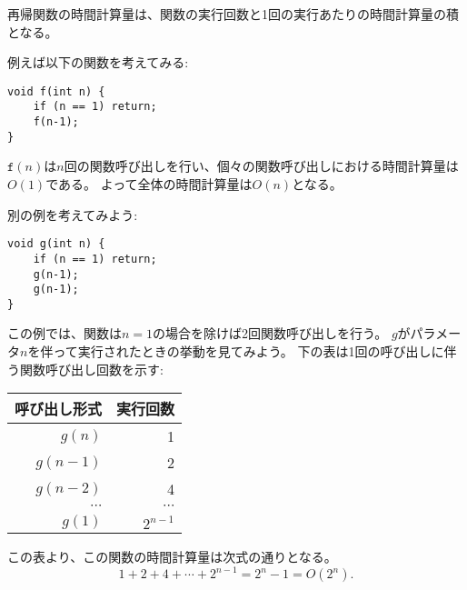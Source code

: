 再帰関数の時間計算量は、関数の実行回数と1回の実行あたりの時間計算量の積となる。

例えば以下の関数を考えてみる:

\begin{lstlisting}
void f(int n) {
    if (n == 1) return;
    f(n-1);
}
\end{lstlisting}

\begin{comment}
The call $\texttt{f}(n)$ causes $n$ function calls,
and the time complexity of each call is $O(1)$.
Thus, the total time complexity is $O(n)$.

As another example, consider the following function:
\end{comment}


$\texttt{f}(n)$は$n$回の関数呼び出しを行い、個々の関数呼び出しにおける時間計算量は$O(1)$である。
よって全体の時間計算量は$O(n)$となる。

別の例を考えてみよう:

\begin{lstlisting}
void g(int n) {
    if (n == 1) return;
    g(n-1);
    g(n-1);
}
\end{lstlisting}

\begin{comment}
In this case each function call generates two other
calls, except for $n=1$.
Let us see what happens when $g$ is called
with parameter $n$.
The following table shows the function calls
produced by this single call:
\begin{center}
\begin{tabular}{rr}
function call & number of calls \\
\hline
$g(n)$ & 1 \\
$g(n-1)$ & 2 \\
$g(n-2)$ & 4 \\
$\cdots$ & $\cdots$ \\
$g(1)$ & $2^{n-1}$ \\
\end{tabular}
\end{center}
Based on this, the time complexity is
\[1+2+4+\cdots+2^{n-1} = 2^n-1 = O(2^n).\]
\end{comment}

この例では、関数は$n=1$の場合を除けば2回関数呼び出しを行う。
$g$がパラメータ$n$を伴って実行されたときの挙動を見てみよう。
下の表は1回の呼び出しに伴う関数呼び出し回数を示す:

\begin{center}
\begin{tabular}{rr}
呼び出し形式 & 実行回数 \\
\hline
$g(n)$ & 1 \\
$g(n-1)$ & 2 \\
$g(n-2)$ & 4 \\
$\cdots$ & $\cdots$ \\
$g(1)$ & $2^{n-1}$ \\
\end{tabular}
\end{center}
この表より、この関数の時間計算量は次式の通りとなる。
\[1+2+4+\cdots+2^{n-1} = 2^n-1 = O(2^n).\]

